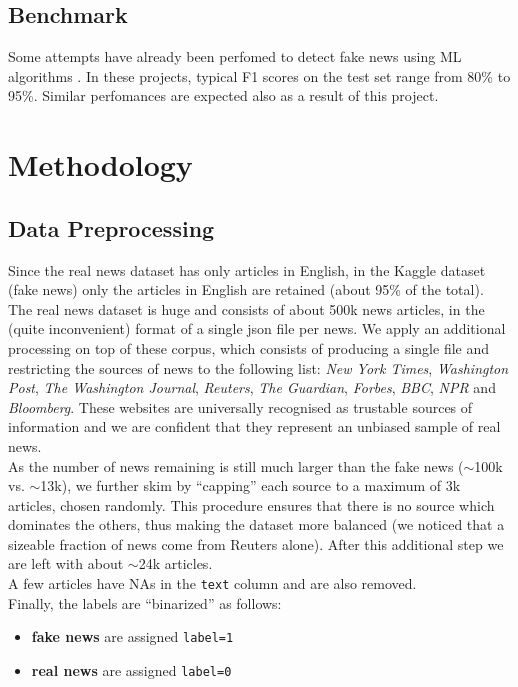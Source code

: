 \documentclass[a4paper,12pt]{article} %
\begin{document}
\subsection{Benchmark}
\label{sec:benchmark}
Some attempts have already been perfomed to detect fake news using ML algorithms \cite{Genes, NYDSA, jarmul}.
In these projects, typical F1 scores on the test set range from 80\% to 95\%.
Similar perfomances are expected also as a result of this project.


\section{Methodology}


\subsection{Data Preprocessing}
\label{sec:preproc}
Since the real news dataset has only articles in English,
in the Kaggle dataset (fake news) only the articles
in English are retained (about 95\% of the total). \\
The real news dataset is huge and consists of about 500k news articles, in the
(quite inconvenient) format of a single json file per news.
We apply an additional processing on top of these corpus, which
consists of producing a single file and restricting the sources of news
to the following list: \textit{New York Times}, \textit{Washington Post},
\textit{The Washington Journal},
\textit{Reuters}, \textit{The Guardian}, \textit{Forbes},
\textit{BBC}, \textit{NPR} and \textit{Bloomberg}.
These websites are universally recognised as trustable sources of
information and we are confident that they represent an unbiased
sample of real news. \\
As the number of news remaining is still much larger
than the fake news ($\sim$100k vs. $\sim$13k), we further skim
by ``capping'' each source to a maximum of 3k articles,
chosen randomly. This procedure ensures that there is no source which
dominates the others, thus making the dataset more balanced (we
noticed that a sizeable fraction of news come from Reuters alone).
After this additional step we are left with about $\sim$24k articles.\\
A few articles have NAs in the \texttt{text} column and are also removed. \\
Finally, the labels are ``binarized'' as follows:
\begin{itemize}
\item \textbf{fake news} are assigned \texttt{label=1}
\item \textbf{real news} are assigned \texttt{label=0}
\end{itemize}
\end{document}
